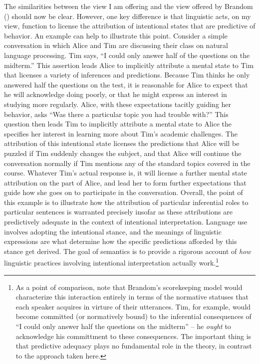The similarities between the view I am offering and the view offered by Brandom (\citeyear{Brandom:1994}) should now be clear. However, one key difference is that linguistic acts, on my view, function to license the attribution of intentional states that are predictive of behavior. An example can help to illustrate this point. Consider a simple conversation in which Alice and Tim are discussing their class on natural language processing. Tim says, ``I could only answer half of the questions on the midterm.'' This assertion leads Alice to implicitly attribute a mental state to Tim that licenses a variety of inferences and predictions. Because Tim thinks he only answered half the questions on the test, it is reasonable for Alice to expect that he will acknowledge doing poorly, or that he might express an interest in studying more regularly. Alice, with these expectations tacitly guiding her behavior, asks ``Was there a particular topic you had trouble with?'' This question then leads Tim to implicitly attribute a mental state to Alice the specifies her interest in learning more about Tim's academic challenges. The attribution of this intentional state licenses the predictions that Alice will be puzzled if Tim suddenly changes the subject, and that Alice will continue the conversation normally if Tim mentions any of the standard topics covered in the course. Whatever Tim's actual response is, it will license a further mental state attribution on the part of Alice, and lead her to form further expectations that guide how she goes on to participate in the conversation. Overall, the point of this example is to illustrate how the attribution of particular inferential roles to particular sentences is warranted precisely insofar as these attributions are predictively adequate in the context of intentional interpretation. Language use involves adopting the intentional stance, and the meanings of linguistic expressions are what determine how the specific predictions afforded by this stance get derived. The goal of semantics is to provide a rigorous account of \textit{how} linguistic practices involving intentional interpretation actually work.\footnote{As a point of comparison, note that Brandom's scorekeeping model would characterize this interaction entirely in terms of the normative statuses that each speaker acquires in virture of their utterances. Tim, for example, would become committed (or normatively bound) to the inferential consequences of ``I could only answer half the questions on the midterm'' -- he \textit{ought} to acknowledge his committment to these consequences. The important thing is that predictive adequacy plays no fundamental role in the theory, in contrast to the approach taken here.} 

